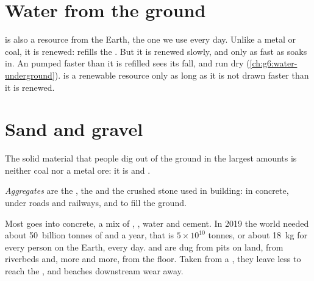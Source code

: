 \section{Water from the ground}

 is also a resource from the Earth, the one we use every day.
Unlike a metal or coal, it is renewed:  refills the . But it
is renewed slowly, and only as fast as  soaks in. An  pumped
faster than it is refilled sees its  fall, and  run dry
(\cref{ch:g6:water-underground}).  is a renewable resource
only as long as it is not drawn faster than it is renewed.

\section{Sand and gravel}

The solid material that people dig out of the ground in the largest amounts
is neither coal nor a metal ore: it is  and .

\begin{definition}[Aggregate]\label{def:g9:earth-resources:aggregate}
\emph{Aggregates} are the , the  and the
crushed stone used in building: in concrete, under roads and railways,
and to fill the ground.
\end{definition}

Most  goes into concrete, a mix of , , water and cement. In
2019 the world needed about 50~billion tonnes of  and  a year,
that is $5 \times 10^{10}$ tonnes, or about \qty{18}{kg} for every person
on the Earth, every day.  and  are dug from pits on land, from
riverbeds and, more and more, from the  floor. Taken from a , they
leave less  to reach the , and beaches downstream wear away.

